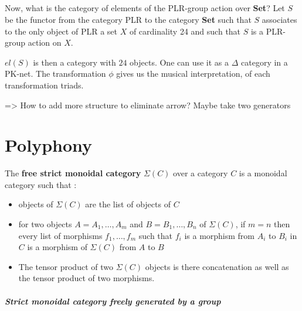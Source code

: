 \documentclass{report}
\begin{document}
\paragraph{}
Now, what is the category of elements of the PLR-group action over \textbf{Set}? Let $S$ be the functor from the category PLR to the category \textbf{Set} such that $S$ associates to the only object of PLR a set $X$ of cardinality 24 and such that $S$ is a PLR-group action on $X$.

$el(S)$ is then a category with $24$ objects. One can use it as a $\Delta$ category in a PK-net. The transformation $\phi$ gives us the musical interpretation, of each transformation triads.

=> How to add more structure to eliminate arrow? Maybe take two generators

\chapter{Polyphony}

\begin{defn}
    The \textbf{free strict monoidal category} $ \Sigma (C)$ over a category $C$ is a monoidal category such that :
    \begin{itemize}
        \item objects of $\Sigma (C)$ are the list of objects of $C$
        \item for two objects $A = A_1,\dots,A_m$ and $B = B_1,\dots,B_n$ of $\Sigma (C)$, if $m = n$ then every list of morphisms $f_1,\dots,f_m$ such that $f_i$ is a morphism from $A_i$ to $B_i$ in $C$ is a morphism of $\Sigma(C)$ from $A$ to $B$
        \item The tensor product of two $\Sigma(C)$ objects is there concatenation as well as the tensor product of two morphisms.
    \end{itemize}
\end{defn}


\paragraph{Strict monoidal category freely generated by a group}
\end{document}
